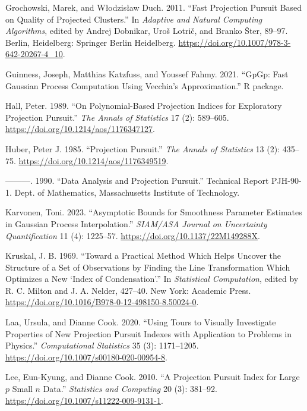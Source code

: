 \documentclass[
  12pt,
]{interact}
\newlength{\cslhangindent}
\newenvironment{CSLReferences}[2] %
 {\begin{list}{}{%
  \setlength{\itemindent}{0pt}
  \setlength{\leftmargin}{0pt}
  \setlength{\parsep}{0pt}
  \ifodd #1
   \setlength{\leftmargin}{\cslhangindent}
   \setlength{\itemindent}{-1\cslhangindent}
  \fi
  \setlength{\itemsep}{#2\baselineskip}}}
 {\end{list}}
\theoremstyle{plain}
\begin{document}
\begin{CSLReferences}{1}{0}
Grochowski, Marek, and Włodzisław Duch. 2011. {``Fast Projection Pursuit
Based on Quality of Projected Clusters.''} In \emph{Adaptive and Natural
Computing Algorithms}, edited by Andrej Dobnikar, Uroš Lotrič, and
Branko Šter, 89--97. Berlin, Heidelberg: Springer Berlin Heidelberg.
\url{https://doi.org/10.1007/978-3-642-20267-4_10}.

Guinness, Joseph, Matthias Katzfuss, and Youssef Fahmy. 2021. {``{GpGp}:
Fast {G}aussian Process Computation Using {V}ecchia's Approximation.''}
R package.

Hall, Peter. 1989. {``On Polynomial-Based Projection Indices for
Exploratory Projection Pursuit.''} \emph{The Annals of Statistics} 17
(2): 589--605. \url{https://doi.org/10.1214/aos/1176347127}.

Huber, Peter J. 1985. {``Projection Pursuit.''} \emph{The Annals of
Statistics} 13 (2): 435--75.
\url{https://doi.org/10.1214/aos/1176349519}.

---------. 1990. {``Data Analysis and Projection Pursuit.''} Technical
Report PJH-90-1. Dept. of Mathematics, Massachusetts Institute of
Technology.

Karvonen, Toni. 2023. {``Asymptotic Bounds for Smoothness Parameter
Estimates in {G}aussian Process Interpolation.''} \emph{SIAM/ASA Journal
on Uncertainty Quantification} 11 (4): 1225--57.
\url{https://doi.org/10.1137/22M149288X}.

Kruskal, J. B. 1969. {``Toward a Practical Method Which Helps Uncover
the Structure of a Set of Observations by Finding the Line
Transformation Which Optimizes a New {`Index of Condensation'}.''} In
\emph{Statistical Computation}, edited by R. C. Milton and J. A. Nelder,
427--40. New York: Academic Press.
\url{https://doi.org/10.1016/B978-0-12-498150-8.50024-0}.

Laa, Ursula, and Dianne Cook. 2020. {``Using Tours to Visually
Investigate Properties of New Projection Pursuit Indexes with
Application to Problems in Physics.''} \emph{Computational Statistics}
35 (3): 1171--1205. \url{https://doi.org/10.1007/s00180-020-00954-8}.

Lee, Eun-Kyung, and Dianne Cook. 2010. {``A Projection Pursuit Index for
Large {\(p\)} Small {\(n\)} Data.''} \emph{Statistics and Computing} 20
(3): 381--92. \url{https://doi.org/10.1007/s11222-009-9131-1}.


\end{CSLReferences}
\end{document}
